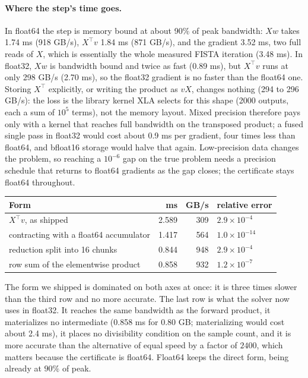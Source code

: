 \documentclass[11pt]{article}
\begin{document}
\paragraph{Where the step's time goes.}
 In float64 the
step is memory bound at about 90\% of peak bandwidth: $Xw$ takes 1.74 ms (918
GB/s), $X^\top v$ 1.84 ms (871 GB/s), and the gradient 3.52 ms, two full reads
of $X$, which is essentially the whole measured FISTA iteration (3.48 ms). In
float32, $Xw$ is bandwidth bound and twice as fast (0.89 ms), but $X^\top v$
runs at only 298 GB/s (2.70 ms), so the float32 gradient is no faster than
the float64 one. Storing $X^\top$ explicitly, or writing the product as $vX$,
changes nothing (294 to 296 GB/s): the loss is the library kernel XLA selects
for this shape (2000 outputs, each a sum of $10^5$ terms), not the memory
layout. Mixed precision therefore pays only with a kernel that reaches full
bandwidth on the transposed product; a fused single pass in float32 would
cost about 0.9 ms per gradient, four times less than float64, and bfloat16
storage would halve that again. Low-precision data changes the problem, so
reaching a $10^{-6}$ gap on the true problem needs a precision schedule that
returns to float64 gradients as the gap closes; the certificate stays float64
throughout.

\begin{center}
\small
\begin{tabular}{lrrl}
\toprule
Form & ms & GB/s & relative error \\
\midrule
$X^\top v$, as shipped & 2.589 & 309 & $2.9\times10^{-4}$ \\
contracting with a float64 accumulator & 1.417 & 564 & $1.0\times10^{-14}$ \\
reduction split into 16 chunks & 0.844 & 948 & $2.9\times10^{-4}$ \\
row sum of the elementwise product & 0.858 & 932 & $1.2\times10^{-7}$ \\
\bottomrule
\end{tabular}
\end{center}

The form we shipped is dominated on both axes at once: it is three times slower
than the third row and no more accurate. The last row is what the solver now
uses in float32. It reaches the same bandwidth as the forward product, it
materializes no intermediate (0.858 ms for 0.80 GB; materializing would cost
about 2.4 ms), it places no divisibility condition on the sample count, and it
is more accurate than the alternative of equal speed by a factor of $2400$,
which matters because the certificate is float64. Float64 keeps the direct form,
being already at $90\%$ of peak.
\end{document}
